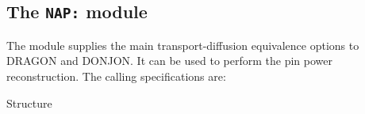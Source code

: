 \subsection{The {\tt NAP:} module}\label{sect:NAPData}

The  module supplies the main transport-diffusion equivalence options to DRAGON and DONJON. It can be
used to perform the pin power reconstruction.\cite{Chambon2014,Fliscounakis2011} The calling specifications are:

\begin{DataStructure}{Structure }
 \moc{:=}     \moc{::}  \\
 \moc{:=}       \moc{::}  \\
 \moc{:=}    \moc{::}  \\
\end{DataStructure}

